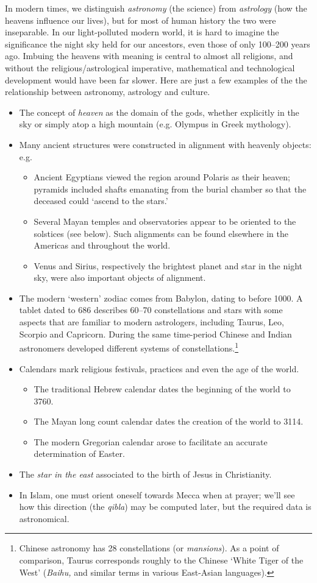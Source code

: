 In modern times, we distinguish \emph{astronomy} (the science) from \emph{astrology} (how the heavens influence our lives), but for most of human history the two were inseparable.  In our light-polluted modern world, it is hard to imagine the significance the night sky held for our ancestors, even those of only 100--200 years ago. Imbuing the heavens with meaning is central to almost all religions, and without the religious/astrological imperative, mathematical and technological development would have been far slower.
Here are just a few examples of the the relationship between astronomy, astrology and culture.
\begin{itemize}\itemsep0pt
	\item The concept of \emph{heaven} as the domain of the gods, whether explicitly in the sky or simply atop a high mountain (e.g.{} Olympus in Greek mythology).
	\item Many ancient structures were constructed in alignment with heavenly objects: e.g.
	\begin{itemize}
	  \item Ancient Egyptians viewed the region around Polaris as their heaven; pyramids included shafts emanating from the burial chamber so that the deceased could `ascend to the stars.' 
		\item Several Mayan temples and observatories appear to be oriented to the solstices (see below). Such alignments can be found elsewhere in the Americas and throughout the world.
		\item Venus and Sirius, respectively the brightest planet and star in the night sky, were also important objects of alignment.
	\end{itemize}
	\item The modern `western' zodiac comes from Babylon, dating to before 1000\BC. A tablet dated to 686\BC{} describes 60--70 constellations and stars with some aspects that are familiar to modern astrologers, including Taurus, Leo, Scorpio and Capricorn. During the same time-period Chinese and Indian astronomers developed different systems of constellations.\footnote{Chinese astronomy has 28 constellations (or \emph{mansions}). As a point of comparison, Taurus corresponds roughly to the Chinese `White Tiger of the West' (\emph{Baihu,} and similar terms in various East-Asian languages).}
	\item Calendars mark religious festivals, practices and even the age of the world.
	\begin{itemize}
	  \item The traditional Hebrew calendar dates the beginning of the world to 3760\BC.
	  \item The Mayan long count calendar dates the creation of the world to 3114\BC.
	  \item The modern Gregorian calendar arose to facilitate an accurate determination of Easter.
	\end{itemize}
	\item The \emph{star in the east} associated to the birth of Jesus in Christianity.
	\item In Islam, one must orient oneself towards Mecca when at prayer; we'll see how this direction (the \emph{qibla}) may be computed later, but the required data is astronomical.
\end{itemize}
